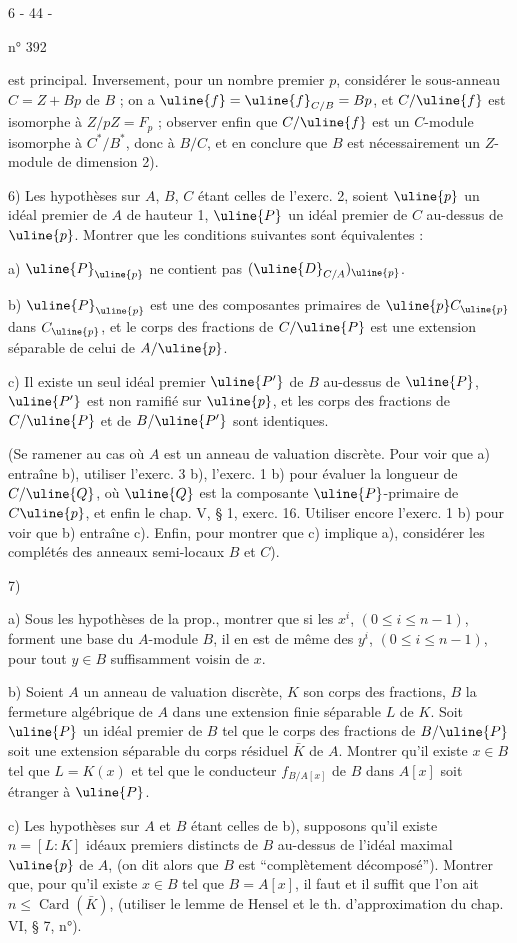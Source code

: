 \begin{center}6 - 44 -\end{center}
\hfill n° 392

est principal. Inversement, pour un nombre premier $p$, considérer le sous-anneau $C=Z+Bp$ de $B$ ; on a $\uline{f}=\uline{f}_{C/B}=Bp$, et $C/\uline{f}$ est isomorphe à $Z/pZ=F_p$ ; observer enfin que $C/\uline{f}$ est un $C$-module isomorphe à $C^*/B^*$, donc à $B/C$, et en conclure que $B$ est nécessairement un $Z$-module de dimension 2).

6) Les hypothèses sur $A$, $B$, $C$ étant celles de l'exerc. 2, soient $\uline{p}$ un idéal premier de $A$ de hauteur 1, $\uline{P}$ un idéal premier de $C$ au-dessus de $\uline{p}$. Montrer que les conditions suivantes sont équivalentes :

a) $\uline{P}_{\uline{p}}$ ne contient pas $(\uline{D}_{C/A})_{\uline{p}}$.

b) $\uline{P}_{\uline{p}}$ est une des composantes primaires de $\uline{p}C_{\uline{p}}$ dans $C_{\uline{p}}$, et le corps des fractions de $C/\uline{P}$ est une extension séparable de celui de $A/\uline{p}$.

c) Il existe un seul idéal premier $\uline{P'}$ de $B$ au-dessus de $\uline{P}$, $\uline{P'}$ est non ramifié sur $\uline{p}$, et les corps des fractions de $C/\uline{P}$ et de $B/\uline{P'}$ sont identiques.

(Se ramener au cas où $A$ est un anneau de valuation discrète. Pour voir que a) entraîne b), utiliser l'exerc. 3 b), l'exerc. 1 b) pour évaluer la longueur de $C/\uline{Q}$, où $\uline{Q}$ est la composante $\uline{P}$-primaire de $C\uline{p}$, et enfin le chap. V, § 1, exerc. 16. Utiliser encore l'exerc. 1 b) pour voir que b) entraîne c). Enfin, pour montrer que c) implique a), considérer les complétés des anneaux semi-locaux $B$ et $C$).

7)

a) Sous les hypothèses de la prop.\quad, montrer que si les $x^i$, $(0\leq i\leq n-1)$, forment une base du $A$-module $B$, il en est de même des $y^i$, $(0\leq i\leq n-1)$, pour tout $y\in B$ suffisamment voisin de $x$.

b) Soient $A$ un anneau de valuation discrète, $K$ son corps des fractions, $B$ la fermeture algébrique de $A$ dans une extension finie séparable $L$ de $K$. Soit $\uline{P}$ un idéal premier de $B$ tel que le corps des fractions de $B/\uline{P}$ soit une extension séparable du corps résiduel $\bar K$ de $A$. Montrer qu'il existe $x\in B$ tel que $L=K(x)$ et tel que le conducteur $f_{B/A[x]}$ de $B$ dans $A[x]$ soit étranger à $\uline{P}$.

c) Les hypothèses sur $A$ et $B$ étant celles de b), supposons qu'il existe $n=[L:K]$ idéaux premiers distincts de $B$ au-dessus de l'idéal maximal $\uline{p}$ de $A$, (on dit alors que $B$ est ``complètement décomposé''). Montrer que, pour qu'il existe $x\in B$ tel que $B=A[x]$, il faut et il suffit que l'on ait $n\leq\operatorname{Card}(\bar K)$, (utiliser le lemme de Hensel et le th. d'approximation du chap. VI, § 7, n°\quad).

